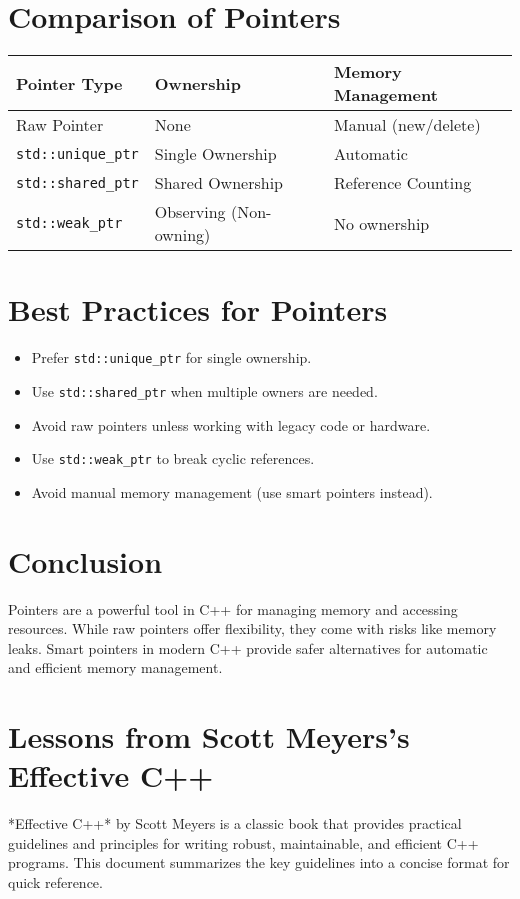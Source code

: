 \section{Comparison of Pointers}

\begin{center}
\begin{tabular}{|l|l|l|}
\hline
\textbf{Pointer Type}   & \textbf{Ownership}       & \textbf{Memory Management} \\ \hline
Raw Pointer             & None                    & Manual (new/delete)        \\ \hline
\texttt{std::unique\_ptr} & Single Ownership        & Automatic                  \\ \hline
\texttt{std::shared\_ptr} & Shared Ownership        & Reference Counting         \\ \hline
\texttt{std::weak\_ptr}   & Observing (Non-owning)  & No ownership               \\ \hline
\end{tabular}
\end{center}

\section{Best Practices for Pointers}
\begin{itemize}
    \item Prefer \texttt{std::unique\_ptr} for single ownership.
    \item Use \texttt{std::shared\_ptr} when multiple owners are needed.
    \item Avoid raw pointers unless working with legacy code or hardware.
    \item Use \texttt{std::weak\_ptr} to break cyclic references.
    \item Avoid manual memory management (use smart pointers instead).
\end{itemize}

\section{Conclusion}
Pointers are a powerful tool in C++ for managing memory and accessing resources. While raw pointers offer flexibility, they come with risks like memory leaks. Smart pointers in modern C++ provide safer alternatives for automatic and efficient memory management.


\section{Lessons from Scott Meyers's Effective C++}
*Effective C++* by Scott Meyers is a classic book that provides practical guidelines and principles for writing robust, maintainable, and efficient C++ programs. This document summarizes the key guidelines into a concise format for quick reference.

